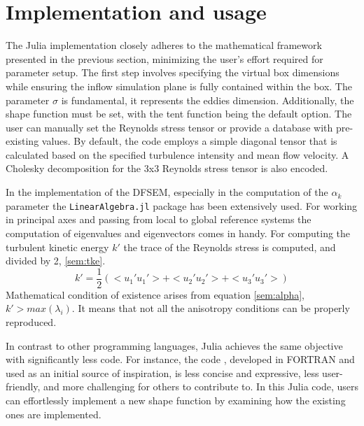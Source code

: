 \documentclass{juliacon}
\begin{document}
\section{Implementation and usage}
The Julia implementation closely adheres to the mathematical framework presented in the previous section, minimizing the user's effort required for parameter setup. The first step involves specifying the virtual box dimensions while ensuring the inflow simulation plane is fully contained within the box. The parameter $\sigma$ is fundamental, it represents the eddies dimension. Additionally, the shape function must be set, with the tent function being the default option. The user can manually set the Reynolds stress tensor or provide a database with pre-existing values. By default, the code employs a simple diagonal tensor that is calculated based on the specified turbulence intensity and mean flow velocity. 
A Cholesky decomposition for the 3x3 Reynolds stress tensor is also encoded.

In the implementation of the DFSEM, especially in the computation of the $\alpha_k$ parameter the \texttt{LinearAlgebra.jl} package has been extensively used. For working in principal axes and passing from local to global reference systems the computation of eigenvalues and eigenvectors comes in handy. For computing the turbulent kinetic energy $k'$ the trace of the Reynolds stress is computed, and divided by 2, \eqref{sem:tke}.
\begin{equation}
    k' = \dfrac{1}{2} (<u_1'u_1'> + <u_2'u_2'> + <u_3'u_3'>)
    \label{sem:tke}
\end{equation}
Mathematical condition of existence arises from equation \eqref{sem:alpha}, $k' > max(\lambda_i)$. It means that not all the anisotropy conditions can be properly reproduced. 


In contrast to other programming languages, Julia achieves the same objective with significantly less code. For instance, the code \cite{Oh2019}, developed in FORTRAN and used as an initial source of inspiration, is less concise and expressive, less user-friendly, and more challenging for others to contribute to. In this Julia code, users can effortlessly implement a new shape function by examining how the existing ones are implemented.
\end{document}
